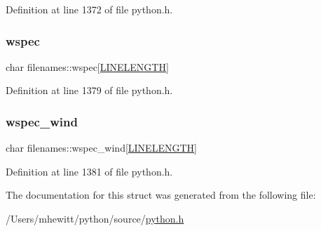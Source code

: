 Definition at line 1372 of file python.\+h.

\mbox{\label{structfilenames_aa5f57d0dd0cd0bb983889cff1a2de34c}} 
\subsubsection{\texorpdfstring{wspec}{wspec}}
{\footnotesize\ttfamily char filenames\+::wspec\mbox{[}\hyperlink{xlog_8c_a10e8c7b8458375c3dbfbb4010a2aba8c}{L\+I\+N\+E\+L\+E\+N\+G\+TH}\mbox{]}}



Definition at line 1379 of file python.\+h.

\mbox{\label{structfilenames_a06c80950019150200d964f62ff9417f1}} 
\subsubsection{\texorpdfstring{wspec\+\_\+wind}{wspec\_wind}}
{\footnotesize\ttfamily char filenames\+::wspec\+\_\+wind\mbox{[}\hyperlink{xlog_8c_a10e8c7b8458375c3dbfbb4010a2aba8c}{L\+I\+N\+E\+L\+E\+N\+G\+TH}\mbox{]}}



Definition at line 1381 of file python.\+h.



The documentation for this struct was generated from the following file\+:\begin{DoxyCompactItemize}
\item 
/\+Users/mhewitt/python/source/\hyperlink{python_8h}{python.\+h}\end{DoxyCompactItemize}
